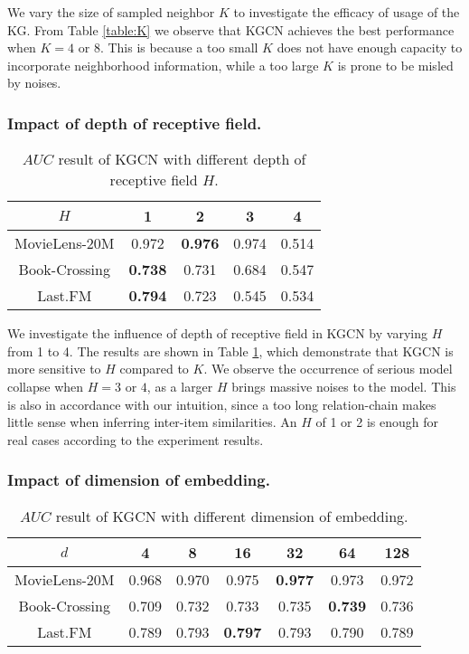 \documentclass[sigconf]{acmart}
\begin{document}
			We vary the size of sampled neighbor $K$ to investigate the efficacy of usage of the KG.
			From Table \ref{table:K} we observe that KGCN achieves the best performance when $K=4$ or $8$.
			This is because a too small $K$ does not have enough capacity to incorporate neighborhood information, while a too large $K$ is prone to be misled by noises.
			
		\subsubsection{Impact of depth of receptive field.}
			\begin{table}[t]
				\centering
				\setlength{\tabcolsep}{8pt}
				\caption{$AUC$ result of KGCN with different depth of receptive field $H$.}
				\begin{tabular}{c|cccc}
					\hline
					$H$ & 1 & 2 & 3 & 4\\
					\hline
					MovieLens-20M & 0.972 & \textbf{0.976} & 0.974 & 0.514\\
					Book-Crossing & \textbf{0.738} & 0.731 & 0.684 & 0.547\\
					Last.FM & \textbf{0.794} & 0.723 & 0.545 & 0.534\\
					\hline
				\end{tabular}
				\label{table:H}
			\end{table}
			
			We investigate the influence of depth of receptive field in KGCN by varying $H$ from 1 to 4.
			The results are shown in Table \ref{table:H}, which demonstrate that KGCN is more sensitive to $H$ compared to $K$.
			We observe the occurrence of serious model collapse when $H=3$ or $4$, as a larger $H$ brings massive noises to the model.
			This is also in accordance with our intuition, since a too long relation-chain makes little sense when inferring inter-item similarities.
			An $H$ of 1 or 2 is enough for real cases according to the experiment results.
			
			
		\subsubsection{Impact of dimension of embedding.}
			\begin{table}[t]
				\centering
				\setlength{\tabcolsep}{4pt}
				\caption{$AUC$ result of KGCN with different dimension of embedding.}
				\begin{tabular}{c|cccccc}
					\hline
					$d$ & 4 & 8 & 16 & 32 & 64 & 128\\
					\hline
					MovieLens-20M & 0.968 & 0.970 & 0.975 & \textbf{0.977} & 0.973 & 0.972\\
					Book-Crossing & 0.709 & 0.732 & 0.733 & 0.735 & \textbf{0.739} & 0.736\\
					Last.FM & 0.789 & 0.793 & \textbf{0.797} & 0.793 & 0.790 & 0.789\\
					\hline
				\end{tabular}
				\label{table:d}
			\end{table}
			
\end{document}
